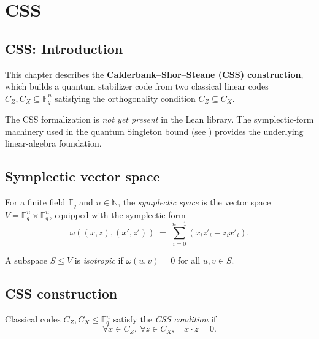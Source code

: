 \section{CSS}
\subsection*{CSS: Introduction}

This chapter describes the \textbf{Calderbank--Shor--Steane (CSS) construction},
which builds a quantum stabilizer code from two classical linear codes
$C_Z, C_X \subseteq \mathbb{F}_q^n$ satisfying the orthogonality condition
$C_Z \subseteq C_X^\perp$.

The CSS formalization is \emph{not yet present} in the Lean library.
The symplectic-form machinery used in the quantum Singleton bound
(see ) provides the underlying linear-algebra
foundation.

\subsection{Symplectic vector space}

\begin{definition}
\notready
For a finite field $\mathbb{F}_q$ and $n \in \mathbb{N}$, the
\emph{symplectic space} is the vector space
$V = \mathbb{F}_q^n \times \mathbb{F}_q^n$,
equipped with the symplectic form
\[
\omega((x,z),(x',z')) \;=\; \sum_{i=0}^{n-1}(x_i z'_i - z_i x'_i).
\]
\end{definition}

\begin{definition}
\notready
A subspace $S \le V$ is \emph{isotropic} if $\omega(u,v)=0$ for all $u,v\in S$.
\end{definition}

\subsection{CSS construction}

\begin{definition}
\notready
Classical codes $C_Z, C_X \le \mathbb{F}_q^n$ satisfy the \emph{CSS condition} if
\[
\forall x \in C_Z,\ \forall z \in C_X,\quad x \cdot z = 0.
\]
\end{definition}

